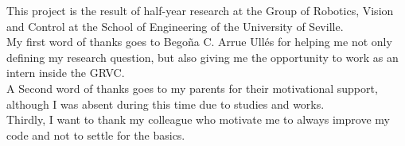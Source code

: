 This project is the result of half-year research at the Group of Robotics, Vision and Control at the School of Engineering of the University of Seville. \\


My first word of thanks goes to Bego\~na C. Arrue Ull\'es for helping me not only defining my research question, but also giving me the opportunity to work as an intern inside the GRVC. \\

A Second word of thanks goes to my parents for their motivational support, although I was absent during this time due to studies and works.  \\

Thirdly, I want to thank my colleague who motivate me to always improve my code and not to settle for the basics.  \\

